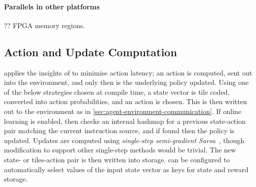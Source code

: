 \paragraph{Parallels in other platforms}
?? FPGA memory regions.

\subsection{Action and Update Computation}\label{sec:action-and-update-computation}
\approachshort{} applies the insights of \textcite{DBLP:journals/firai/TravnikMSP18} to minimise action latency; an action is computed, sent out into the environment, and only then is the underlying policy updated.
Using one of the below strategies chosen at compile time, a state vector is tile coded, converted into action probabilities, and an action is chosen.
This is then written out to the environment as in \cref{sec:agent-environment-communication}.
If online learning is enabled, \approachshort{} then checks an internal hashmap for a previous state-action pair matching the current instruction source, and if found then the policy is updated.
Updates are computed using \emph{single-step semi-gradient Sarsa}~\cite[pp. \numrange{217}{221}]{RL2E}, though modification to support other single-step methods would be trivial.
The new state- or tiles-action pair is then written into storage.
\approachshort{} can be configured to automatically select values of the input state vector as keys for state and reward storage.

